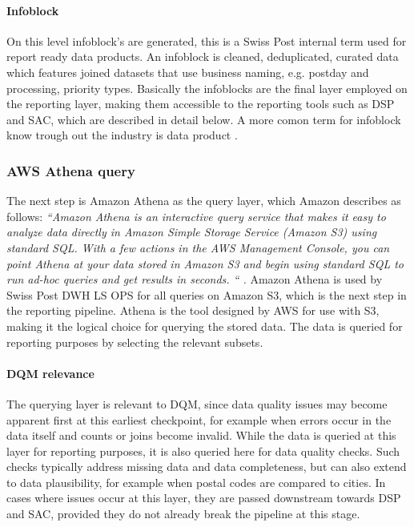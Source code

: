 \paragraph{Infoblock}
\label{SolutionLandscapeInfoblock}
On this level \gls{infoblock}'s are generated, this is a Swiss Post internal term used for report ready data products. An infoblock is cleaned, deduplicated, curated data which features joined datasets that use business naming, e.g. \gls{postday} and processing, priority types. Basically the infoblocks are the final layer employed on the reporting layer, making them accessible to the reporting tools such as \gls{DSP} and \gls{SAC}, which are described in detail below. A more comon term for infoblock know trough out the industry is data product  \cite{alation_data_product, ibm_data_product}. 

\subsubsection*{AWS Athena query}
\label{SolutionAthenaQuery}
The next step is Amazon Athena as the query layer, which Amazon describes as follows: \textit{ “Amazon Athena is an interactive query service that makes it easy to analyze data directly in Amazon Simple Storage Service (Amazon S3) using standard SQL. With a few actions in the AWS Management Console, you can point Athena at your data stored in Amazon S3 and begin using standard SQL to run ad-hoc queries and get results in seconds. “ \cite{aws_athena_docs}.}
Amazon Athena is used by Swiss Post DWH LS OPS for all queries on Amazon S3, which is the next step in the reporting pipeline. Athena is the tool designed by AWS for use with S3, making it the logical choice for querying the stored data. The data is queried for reporting purposes by selecting the relevant subsets.

\paragraph{DQM relevance}
The querying layer is relevant to DQM, since data quality issues may become apparent first at this earliest checkpoint, for example when errors occur in the data itself and counts or joins become invalid. While the data is queried at this layer for reporting purposes, it is also queried here for data quality checks. Such checks typically address missing data and data completeness, but can also extend to data plausibility, for example when postal codes are compared to cities. In cases where issues occur at this layer, they are passed downstream towards DSP and SAC, provided they do not already break the pipeline at this stage.


